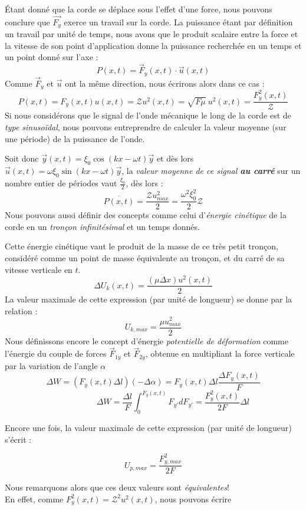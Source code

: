 Étant donné que la corde se déplace sous l'effet d'une force, nous pouvons conclure que $\vec{F_{y}}$ exerce un travail sur la corde. 
La puissance étant par définition un travail par unité de temps, nous avons que le produit scalaire entre la force et la vitesse de son point d'application 
donne la puissance recherchée en un temps et un point donné sur l'axe :
\[P(x,t) = \vec{F}_{y}(x,t) \cdot \vec{u}(x,t) \]
Comme $\vec{F}_{y}$ et $\vec{u}$ ont la même direction, nous écrirons alors dans ce cas : 
\[ P(x,t) = F_{y}(x,t) u(x,t) = \mathcal{Z} u^{2}(x,t) = \sqrt{F \mu}\: u^{2}(x,t) = \frac{F_{y}^2(x,t)}{\mathcal{Z}}\]
Si nous considérons que le signal de l'onde mécanique le long de la corde est de \textit{type sinusoïdal}, 
nous pouvons entreprendre de calculer la valeur moyenne (sur une période) de la puissance de l'onde. 

Soit donc $\vec{y}(x,t) = \xi_{0} \cos(kx-\omega t) \vec{y}$ et dès lors $\vec{u}(x,t) = \omega \xi_{0} \sin(kx-\omega t) \vec{y}$, la \textit{valeur moyenne de ce signal \textbf{au carré}} sur un nombre entier de périodes vaut $\frac{\xi_{0}}{2}$, dès lors : 
\[ \overline{P(x,t)} = \frac{\mathcal{Z} u^{2}_{max}}{2} = \frac{\omega^{2} \xi_{0}^{2}}{2} \mathcal{Z}\]
Nous pouvons aussi définir des concepts comme celui d'\textit{énergie cinétique} de la corde en un \textit{tronçon infinitésimal} et un temps donnés.

Cette énergie cinétique vaut le produit de la masse de ce très petit tronçon, considéré comme un point de masse équivalente au tronçon, et du carré de sa vitesse
verticale en $t$. 
\[\Delta U_{k}(x,t) = \frac{(\mu \Delta x)u^{2}(x,t)}{2} \] 
La valeur maximale de cette expression (par unité de longueur) se donne par la relation : 
\[U_{k,max} = \frac{\mu u_{max}^{2}}{2}\]
Nous définissons encore le concept d'énergie \textit{potentielle de déformation} comme l'énergie du couple de forces $\vec{F}_{1y}$ et $\vec{F}_{2y}$, obtenue en multipliant la force verticale par la variation de l'angle $\alpha$
\[\Delta W = (F_{y}(x,t) \Delta l)(-\Delta \alpha)= F_{y}(x,t) \Delta l \frac{\Delta F_{y}(x,t)}{F} \]
\[\hspace{2cm} \Delta W = \frac{\Delta l}{F} \int_{0}^{F_{y}(x,t)} F_{y'} dF_{y'} = \frac{F_{y}^{2}(x,t)}{2F}\Delta l \]

Encore une fois, la valeur maximale de cette expression (par unité de longueur) s'écrit : 

\[U_{p,max} = \frac{F_{y,max}^{2}}{2F}\]

Nous remarquons alors que ces deux valeurs sont \textit{équivalentes}! 
\\ En effet, comme $F_{y}^{2}(x,t)  = \mathcal{Z}^{2} u^{2}(x,t)$, nous pouvons écrire 

